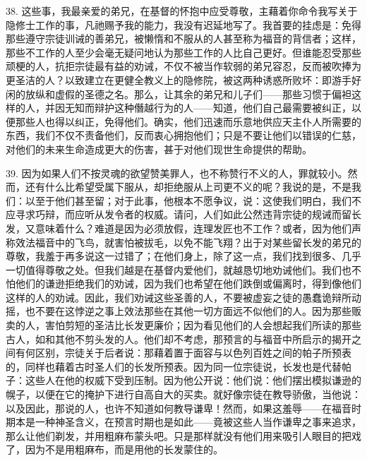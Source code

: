 38. 这些事，我最亲爱的弟兄，在基督的怀抱中应受尊敬，主藉着你命令我写关于隐修士工作的事，凡祂赐予我的能力，我没有迟延地写了。我首要的挂虑是：免得那些遵守宗徒训诫的善弟兄，被懒惰和不服从的人甚至称为福音的背信者；这样，那些不工作的人至少会毫无疑问地认为那些工作的人比自己更好。但谁能忍受那些顽梗的人，抗拒宗徒最有益的劝诫，不仅不被当作软弱的弟兄容忍，反而被吹捧为更圣洁的人？以致建立在更健全教义上的隐修院，被这两种诱惑所败坏：即游手好闲的放纵和虚假的圣德之名。那么，让其余的弟兄和儿子们——那些习惯于偏袒这样的人，并因无知而辩护这种僭越行为的人——知道，他们自己最需要被纠正，以便那些人也得以纠正，免得他们。确实，他们迅速而乐意地供应天主仆人所需要的东西，我们不仅不责备他们，反而衷心拥抱他们；只是不要让他们以错误的仁慈，对他们的未来生命造成更大的伤害，甚于对他们现世生命提供的帮助。\par

39. 因为如果人们不按灵魂的欲望赞美罪人，也不称赞行不义的人，罪就较小。然而，还有什么比希望受属下服从，却拒绝服从上司更不义的呢？我说的是，不是我们：以至于他们甚至留；对于此事，他根本不愿争议，说：这使我们明白，我们不应寻求巧辩，而应听从发令者的权威。请问，人们如此公然违背宗徒的规诫而留长发，又意味着什么？难道是因为必须放假，连理发匠也不工作？或者，因为他们声称效法福音中的飞鸟，就害怕被拔毛，以免不能飞翔？出于对某些留长发的弟兄的尊敬，我羞于再多说这一过错了；在他们身上，除了这一点，我们找到很多、几乎一切值得尊敬之处。但我们越是在基督内爱他们，就越恳切地劝诫他们。我们也不怕他们的谦逊拒绝我们的劝诫，因为我们也希望在他们跌倒或偏离时，得到像他们这样的人的劝诫。因此，我们劝诫这些圣善的人，不要被虚妄之徒的愚蠢诡辩所动摇，也不要在这悖逆之事上效法那些在其他一切方面远不似他们的人。因为那些贩卖的人，害怕剪短的圣洁比长发更廉价；因为看见他们的人会想起我们所读的那些古人，如和其他不剪头发的人。他们却不考虑，那预言的与福音中所启示的揭开之间有何区别，宗徒关于后者说：那藉着置于面容与以色列百姓之间的帕子所预表的，同样也藉着古时圣人们的长发所预表。因为同一位宗徒说，长发也是代替帕子：这些人在他的权威下受到压制。因为他公开说：他们说：他们摆出模拟谦逊的幌子，以便在它的掩护下进行自高自大的买卖。就好像宗徒在教导骄傲，当他说：以及因此，那说的人，也许不知道如何教导谦卑！然而，如果这羞辱——在福音时期本是一种神圣含义，在预言时期也是如此——竟被这些人当作谦卑之事来追求，那么让他们剃发，并用粗麻布蒙头吧。只是那样就没有他们用来吸引人眼目的把戏了，因为不是用粗麻布，而是用他的长发蒙住的。\par

